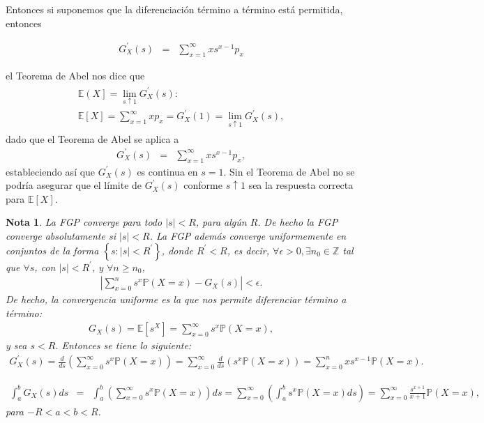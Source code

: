 \documentclass{article}
\newtheorem{Note}{Nota}[section]
\newcommand{\ent}{\mathbb{Z}}
\newcommand{\esp}{\mathbb{E}}
\newcommand{\prob}{\mathbb{P}}
\numberwithin{equation}{section}
\begin{document}
Entonces si suponemos que la diferenciaci\'on t\'ermino a t\'ermino est\'a permitida, entonces

\begin{eqnarray}
G_{X}^{'}\left(s\right)&=&\sum_{x=1}^{\infty}xs^{x-1}p_{x}
\end{eqnarray}

el Teorema de Abel nos dice que
\begin{eqnarray}
\begin{array}{l}
\esp\left(X\right]=\lim_{s\uparrow1}G_{X}^{'}\left(s\right):\\
\esp\left[X\right]=\sum_{x=1}^{\infty}xp_{x}=G_{X}^{'}\left(1\right)=\lim_{s\uparrow1}G_{X}^{'}\left(s\right),
\end{array}
\end{eqnarray}
dado que el Teorema de Abel se aplica a
\begin{eqnarray}
G_{X}^{'}\left(s\right)&=&\sum_{x=1}^{\infty}xs^{x-1}p_{x},
\end{eqnarray}
estableciendo as\'i que $G_{X}^{'}\left(s\right)$ es continua en $s=1$. Sin el Teorema de Abel no se podr\'ia asegurar que el l\'imite de $G_{X}^{'}\left(s\right)$ conforme $s\uparrow1$ sea la respuesta correcta para $\esp\left[X\right]$.

\begin{Note}
La FGP converge para todo $|s|<R$, para alg\'un $R$. De hecho la FGP converge absolutamente si $|s|<R$. La FGP adem\'as converge uniformemente en conjuntos de la forma $\left\{s:|s|<R^{'}\right\}$, donde $R^{'}<R$, es decir, $\forall\epsilon>0, \exists n_{0}\in\ent$ tal que $\forall s$, con $|s|<R^{'}$, y $\forall n\geq n_{0}$,
\begin{eqnarray}
|\sum_{x=0}^{n}s^{x}\prob\left(X=x\right)-G_{X}\left(s\right)|<\epsilon.
\end{eqnarray}
De hecho, la convergencia uniforme es la que nos permite diferenciar t\'ermino a t\'ermino:
\begin{eqnarray}
G_{X}\left(s\right)=\esp\left[s^{X}\right]=\sum_{x=0}^{\infty}s^{x}\prob\left(X=x\right),
\end{eqnarray}
y sea $s<R$. Entonces se tiene lo siguiente: 
\begin{eqnarray}
G_{X}^{'}\left(s\right)=\frac{d}{ds}\left(\sum_{x=0}^{\infty}s^{x}\prob\left(X=x\right)\right)=\sum_{x=0}^{\infty}\frac{d}{ds}\left(s^{x}\prob\left(X=x\right)\right)=\sum_{x=0}^{n}xs^{x-1}\prob\left(X=x\right).
\end{eqnarray}

\begin{eqnarray}
\int_{a}^{b}G_{X}\left(s\right)ds&=&\int_{a}^{b}\left(\sum_{x=0}^{\infty}s^{x}\prob\left(X=x\right)\right)ds=\sum_{x=0}^{\infty}\left(\int_{a}^{b}s^{x}\prob\left(X=x\right)ds\right)=\sum_{x=0}^{\infty}\frac{s^{x+1}}{x+1}\prob\left(X=x\right),
\end{eqnarray}
para $-R<a<b<R$.

\end{Note}
\end{document}
